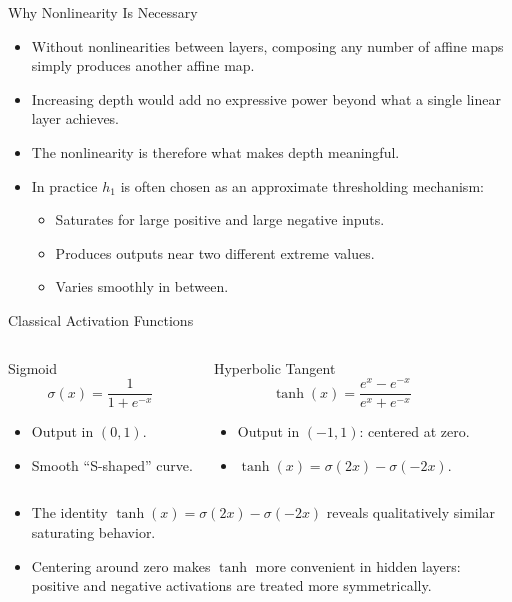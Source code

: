 \begin{frame}{Why Nonlinearity Is Necessary}
  \begin{itemize}
    \item Without nonlinearities between layers, \alert{composing any number of affine maps} simply produces another affine map.
    \item Increasing depth would add \alert{no expressive power} beyond what a single linear layer achieves.
    \item The nonlinearity is therefore what makes depth \alert{meaningful}.
    \item In practice $h_1$ is often chosen as an approximate thresholding mechanism:
      \begin{itemize}
        \item Saturates for large positive and large negative inputs.
        \item Produces outputs near two different extreme values.
        \item Varies smoothly in between.
      \end{itemize}
  \end{itemize}
\end{frame}

\begin{frame}{Classical Activation Functions}
  \begin{columns}[t]
      \begin{block}{Sigmoid}
        \[
          \sigma(x) = \frac{1}{1+e^{-x}}
        \]
        \begin{itemize}
          \item Output in $(0,1)$.
          \item Smooth ``S-shaped'' curve.
        \end{itemize}
      \end{block}
      \begin{block}{Hyperbolic Tangent}
        \[
          \tanh(x) = \frac{e^x - e^{-x}}{e^x + e^{-x}}
        \]
        \begin{itemize}
          \item Output in $(-1,1)$: \alert{centered at zero}.
          \item $\tanh(x) = \sigma(2x) - \sigma(-2x)$.
        \end{itemize}
      \end{block}
  \end{columns}
  \medskip
  \begin{itemize}
    \item The identity $\tanh(x)=\sigma(2x)-\sigma(-2x)$ reveals qualitatively similar saturating behavior.
    \item Centering around zero makes $\tanh$ more convenient in hidden layers: positive and negative activations are treated more symmetrically.
  \end{itemize}
\end{frame}

